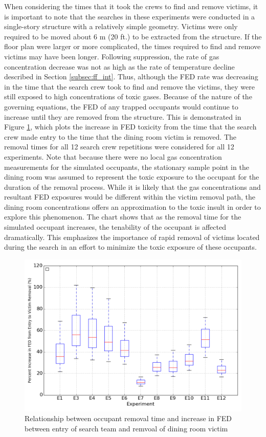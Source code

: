 \documentclass[12pt,oneside]{article}
\begin{document}
When considering the times that it took the crews to find and remove victims, it is important to note that the searches in these experiments were conducted in a single-story structure with a relatively simple geometry. Victims were only required to be moved about 6 m (20 ft.) to be extracted from the structure. If the floor plan were larger or more complicated, the times required to find and remove victims may have been longer. Following suppression, the rate of gas concentration decrease was not as high as the rate of temperature decline described in Section \ref{subsec:ff_int}. Thus, although the FED rate was decreasing in the time that the search crew took to find and remove the victims, they were still exposed to high concentrations of toxic gases. Because of the nature of the governing equations, the FED of any trapped occupants would continue to increase until they are removed from the structure. This is demonstrated in Figure \ref{fig:vic_removal}, which plots the increase in FED toxicity from the time that the search crew made entry to the time that the dining room victim is removed. The removal times for all 12 search crew repetitions were considered for all 12 experiments. Note that because there were no local gas concentration measurements for the simulated occupants, the stationary sample point in the dining room was assumed to represent the toxic exposure to the occupant for the duration of the removal process. While it is likely that the gas concentrations and resultant FED exposures would be different within the victim removal path, the dining room concentrations offers an approximation to the toxic insult in order to explore this phenomenon. The chart shows that as the removal time for the simulated occupant increases, the tenability of the occupant is affected dramatically. This emphasizes the importance of rapid removal of victims located during the search in an effort to minimize the toxic exposure of these occupants. 
\begin{figure}[!ht]
	\centering
	\includegraphics[width=.75\textwidth]{../Figures/victim_removal/V1}
	\caption[Relationship between occupant removal time and increase in FED between entry of search team and removal of dining room victim]{Relationship between occupant removal time and increase in FED between entry of search team and remvoal of dining room victim}
	\label{fig:vic_removal}
\end{figure}
\end{document}
